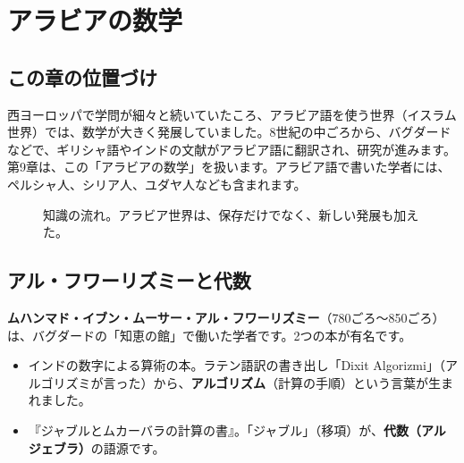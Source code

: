 \documentclass[a4paper,11pt,openany]{ltjsbook}
\begin{document}
\chapter{アラビアの数学}

\section{この章の位置づけ}

西ヨーロッパで学問が細々と続いていたころ、アラビア語を使う世界（イスラム世界）では、数学が大きく発展していました。8世紀の中ごろから、バグダードなどで、ギリシャ語やインドの文献がアラビア語に翻訳され、研究が進みます。第9章は、この「アラビアの数学」を扱います。アラビア語で書いた学者には、ペルシャ人、シリア人、ユダヤ人なども含まれます。

\begin{figure}[htbp]
\centering
{}
\caption{知識の流れ。アラビア世界は、保存だけでなく、新しい発展も加えた。}
\end{figure}

\section{アル・フワーリズミーと代数}

\textbf{ムハンマド・イブン・ムーサー・アル・フワーリズミー}（780ごろ〜850ごろ）は、バグダードの「知恵の館」で働いた学者です。2つの本が有名です。

\begin{itemize}[leftmargin=*]
\item インドの数字による算術の本。ラテン語訳の書き出し「Dixit Algorizmi」（アルゴリズミが言った）から、\textbf{アルゴリズム}（計算の手順）という言葉が生まれました。
\item 『ジャブルとムカーバラの計算の書』。「ジャブル」（移項）が、\textbf{代数（アルジェブラ）}の語源です。
\end{itemize}
\end{document}
